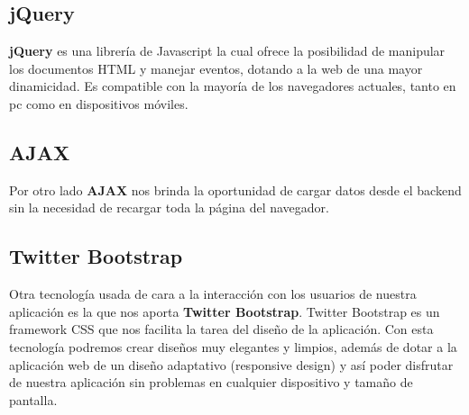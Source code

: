 \subsection{jQuery}
\textbf{jQuery} es una librería de Javascript la cual ofrece la posibilidad de manipular los documentos HTML y manejar eventos, dotando a la web de una mayor dinamicidad. Es compatible con la mayoría de los navegadores actuales, tanto en pc como en dispositivos móviles. \\

\subsection{AJAX}
Por otro lado \textbf{AJAX} nos brinda la oportunidad de cargar datos desde el backend sin la necesidad de recargar toda la página del navegador. \\

\subsection{Twitter Bootstrap}
Otra tecnología usada de cara a la interacción con los usuarios de nuestra aplicación es la que nos aporta \textbf{Twitter Bootstrap}. Twitter Bootstrap es un framework CSS que nos facilita la tarea del diseño de la aplicación. Con esta tecnología podremos crear diseños muy elegantes y limpios, además de dotar a la aplicación web de un diseño adaptativo (responsive design) y así poder disfrutar de nuestra aplicación sin problemas en cualquier dispositivo y tamaño de pantalla. \\
